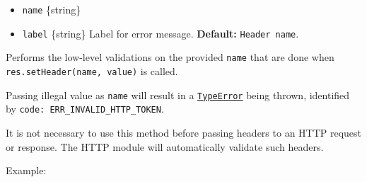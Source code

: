 \begin{itemize}
\tightlist
\item
  \texttt{name} \{string\}
\item
  \texttt{label} \{string\} Label for error message. \textbf{Default:}
  \texttt{\textquotesingle{}Header\ name\textquotesingle{}}.
\end{itemize}

Performs the low-level validations on the provided \texttt{name} that
are done when \texttt{res.setHeader(name,\ value)} is called.

Passing illegal value as \texttt{name} will result in a
\href{errors.md\#class-typeerror}{\texttt{TypeError}} being thrown,
identified by
\texttt{code:\ \textquotesingle{}ERR\_INVALID\_HTTP\_TOKEN\textquotesingle{}}.

It is not necessary to use this method before passing headers to an HTTP
request or response. The HTTP module will automatically validate such
headers.

Example:

\begin{Shaded}
\begin{Highlighting}[]
 \OperatorTok{;}

\NormalTok{ \{}
  \NormalTok{(}\StringTok{\textquotesingle{}\textquotesingle{}}\NormalTok{)}\OperatorTok{;}
\NormalTok{\} }
   \NormalTok{)}\OperatorTok{;} 
  \NormalTok{)}\OperatorTok{;} 
  \NormalTok{)}\OperatorTok{;} 
\NormalTok{\}}
\end{Highlighting}
\end{Shaded}

